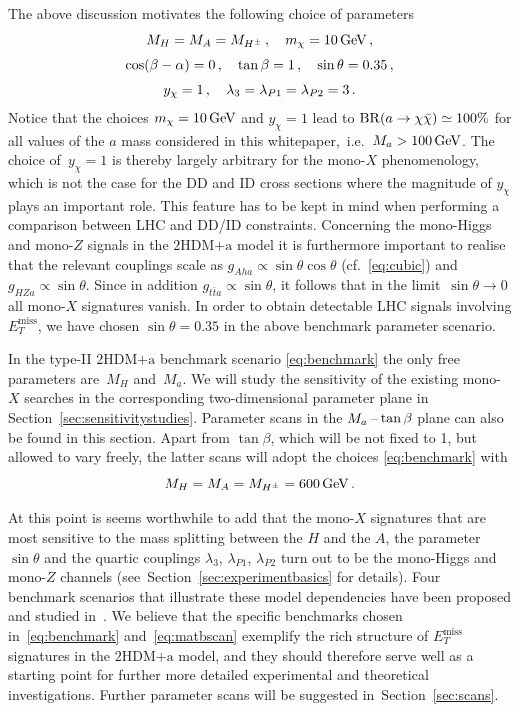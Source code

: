 \documentclass[a4paper, 11pt,notoc]{article}
\newcommand{\MET}{\ensuremath{E_T^\mathrm{miss}}\xspace}
\newcommand{\hdma}{\ensuremath{\textrm{2HDM+a}}\xspace}
\begin{document}
The above discussion motivates the following choice of parameters
\begin{gather} 
 M_H  = M_A = M_{H^\pm} \,, \quad m_\chi = 10 \, {\rm GeV} \,,\notag  \\[1mm]
\cos (\beta - \alpha) = 0\,, \quad   \tan \beta = 1\,, \quad  \sin\theta = 0.35\,, \label{eq:benchmark} \\[1mm]
y_\chi  = 1\,, \quad \lambda_3 =  \lambda_{P1} = \lambda_{P2} =3 \,. \notag 
\end{gather}
Notice that the choices $m_\chi = 10 \, {\rm GeV}$ and $y_\chi  = 1$ lead to ${\rm BR} (a \to \chi \bar \chi) \simeq 100 \%$ for all values of the $a$ mass considered in this whitepaper,~i.e.~$M_a > 100 \, {\rm GeV}$. The choice of~$y_\chi  = 1$ is thereby largely arbitrary for the mono-$X$ phenomenology, which is not the case for the DD and ID cross sections where the magnitude of $y_\chi$ plays an important role. This feature  has to be  kept in mind when performing a comparison between LHC and DD/ID constraints. Concerning the mono-Higgs and mono-$Z$ signals in the \hdma model it is furthermore important to realise that the relevant couplings scale as $g_{Aha} \propto \sin \theta \cos \theta$  (cf.~\eqref{eq:cubic}) and $g_{HZa} \propto \sin \theta$. Since in addition $g_{t \bar t a} \propto \sin \theta$,  it follows that in the limit~$\sin \theta \to 0$ all mono-$X$ signatures vanish. In order to obtain detectable LHC signals involving $\MET$, we have chosen $\sin\theta = 0.35$ in the above benchmark parameter scenario. 

In the  type-II \hdma  benchmark scenario \eqref{eq:benchmark} the only free parameters are~$M_H$ and~$M_a$. We will study the sensitivity of the existing mono-$X$ searches in the corresponding two-dimensional parameter plane in Section~\ref{sec:sensitivitystudies}. Parameter scans in the $M_a\hspace{0.5mm}$--$\hspace{0.5mm}\tan \beta$ plane can also be found in this section.  Apart from $\tan \beta$, which will be not fixed to 1, but allowed to vary freely, the latter  scans  will adopt the choices \eqref{eq:benchmark} with  
\begin{equation} \label{eq:matbscan}
M_H  = M_A = M_{H^\pm} =  600 \, {\rm GeV} \,.
\end{equation} 

At this point is seems worthwhile to add that the mono-$X$ signatures that are most sensitive to the mass splitting between the $H$ and the $A$, the parameter $\sin \theta$ and the quartic couplings $\lambda_{3}$, $\lambda_{P1}$, $\lambda_{P2}$ turn out to be  the mono-Higgs and mono-$Z$ channels (see~Section~\ref{sec:experimentbasics} for details). Four benchmark scenarios that illustrate these model {\color{green} dependencies} have been proposed and studied in~\cite{Bauer:2017ota}.  {\color{red} We believe that the specific benchmarks  chosen in~\eqref{eq:benchmark} and~\eqref{eq:matbscan}   exemplify  the rich structure of $\MET$ signatures in the \hdma model, and they should therefore serve well as a starting point for further more detailed experimental and theoretical investigations.} Further parameter scans will be suggested in~Section~\ref{sec:scans}. 
\end{document}
